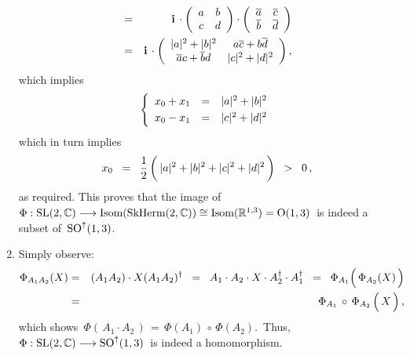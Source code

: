\begin{enumerate}
\begin{eqnarray*}
	\\
	& = &
		\textnormal{\bf i}\,\cdot
		\left(\begin{array}{cc} a & b \\ c & d \end{array}\right)
		\cdot
		\left(\begin{array}{cc} \overline{a} & \overline{c} \\ \overline{b} & \overline{d} \end{array}\right)
	\\
	& = &
		\textnormal{\bf i}\,\cdot
		\left(\begin{array}{cc}
			\vert a \vert^{2} + \vert b \vert^{2} & a\overline{c} + b\overline{d}
			\\
			\overline{a}c + \overline{b}d & \vert c \vert^{2} + \vert d \vert^{2}
			\end{array}\right),
	\end{eqnarray*}
	which implies
	\begin{equation*}
	\left\{\begin{array}{ccc}
		x_{0} + x_{1} & = & \vert a \vert^{2} + \vert b \vert^{2}
		\\
		x_{0} - x_{1} & \overset{{\color{white}1}}{=} & \vert c \vert^{2} + \vert d \vert^{2}
		\end{array}\right.
	\end{equation*}
	which in turn implies
	\begin{equation*}
	x_{0}
	\;\; = \;\;
		\dfrac{1}{2}\left(\,
			\vert a \vert^{2} \overset{{\color{white}1}}{+} \vert b \vert^{2} + \vert c \vert^{2} + \vert d \vert^{2}
			\,\right)
	\;\; > \;\;
		0\,,
	\end{equation*}
	as required. This proves that the image of
	\,$\Phi : \textnormal{SL}(2,\mathbb{C}) \longrightarrow \textnormal{Isom}(\textnormal{SkHerm}(2,\mathbb{C})) \cong \textnormal{Isom}(\mathbb{R}^{1,3}) = \textnormal{O}(1,3)$\,
	is indeed a subset of \,$\textnormal{SO}^{\uparrow}(1,3)$.
\item
	Simply observe:
	\begin{eqnarray*}
	\Phi_{A_{1}A_{2}}(X)
	& = &
		(A_{1}A_{2}) \cdot X (A_{1}A_{2})^{\dagger}
	\;\; = \;\;
		A_{1} \cdot A_{2} \cdot X \cdot A_{2}^{\dagger} \cdot A_{1}^{\dagger}
	\;\; = \;\;
		\Phi_{A_{1}}\!\left(\,\Phi_{A_{2}}(\overset{{\color{white}.}}{X})\,\right)
	\\
	& = &
		\Phi_{A_{1}} \,\circ\, \Phi_{A_{2}}\left(\,\overset{{\color{white}.}}{X}\,\right),
	\end{eqnarray*}
	which shows
	\,$\Phi(\,A_{1} \cdot A_{2}\,) \, = \, \Phi(A_{1}) \,\circ\, \Phi(A_{2})$.\,
	Thus, \,$\Phi : \textnormal{SL}(2,\mathbb{C}) \longrightarrow \textnormal{SO}^{\uparrow}(1,3)$\, is indeed a homomorphism.

\end{enumerate}

